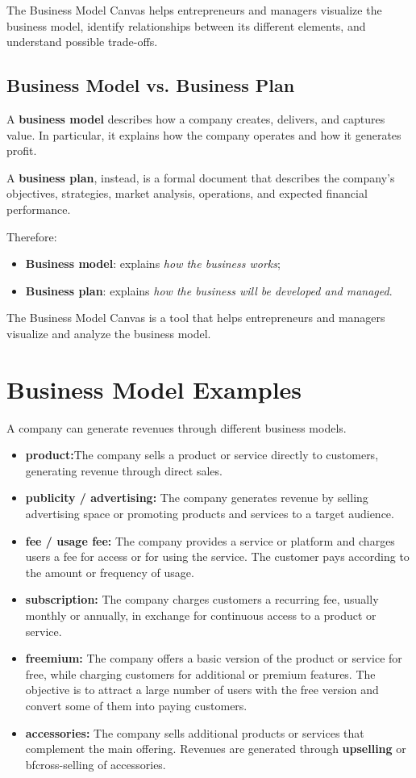 \documentclass[12pt,a4paper]{report}
\begin{document}
The Business Model Canvas helps entrepreneurs and managers visualize the business model, identify relationships between its different elements, and understand possible trade-offs.

\subsection{Business Model vs. Business Plan}

A \textbf{business model} describes how a company creates, delivers, and captures value. In particular, it explains how the company operates and how it generates profit.

A \textbf{business plan}, instead, is a formal document that describes the company's objectives, strategies, market analysis, operations, and expected financial performance.

Therefore:

\begin{itemize}
    \item \textbf{Business model}: explains \emph{how the business works};
    \item \textbf{Business plan}: explains \emph{how the business will be developed and managed}.
\end{itemize}

The Business Model Canvas is a tool that helps entrepreneurs and managers visualize and analyze the business model.

\section{Business Model Examples}

A company can generate revenues through different business models.
\begin{itemize}
    \item \textbf{product:}The company sells a product or service directly to customers, generating revenue through direct sales.
    \item \textbf{publicity / advertising:} The company generates revenue by selling advertising space or promoting products and services to a target audience.
    \item \textbf{fee / usage fee:} The company provides a service or platform and charges users a fee for access or for using the service. The customer pays according to the amount or frequency of usage.
    \item \textbf{subscription:} The company charges customers a recurring fee, usually monthly or annually, in exchange for continuous access to a product or service.
    \item \textbf{freemium:} The company offers a basic version of the product or service for free, while charging customers for additional or premium features. The objective is to attract a large number of users with the free version and convert some of them into paying customers.
    \item \textbf{accessories:} The company sells additional products or services that complement the main offering. Revenues are generated through \textbf{upselling} or \text bf{cross-selling} of accessories.
\end{itemize}
\end{document}
